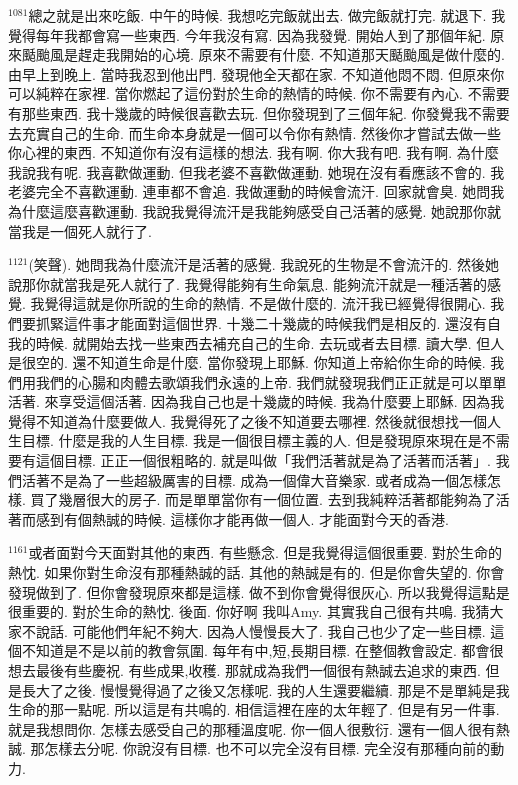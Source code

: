 \documentclass{book}
\begin{document}
$^{1081}$總之就是出來吃飯.
中午的時候.
我想吃完飯就出去.
做完飯就打完.
就退下.
我覺得每年我都會寫一些東西.
今年我沒有寫.
因為我發覺.
開始人到了那個年紀.
原來颳颱風是趕走我開始的心境.
原來不需要有什麼.
不知道那天颳颱風是做什麼的.
由早上到晚上.
當時我忍到他出門.
發現他全天都在家.
不知道他悶不悶.
但原來你可以純粹在家裡.
當你燃起了這份對於生命的熱情的時候.
你不需要有內心.
不需要有那些東西.
我十幾歲的時候很喜歡去玩.
但你發現到了三個年紀.
你發覺我不需要去充實自己的生命.
而生命本身就是一個可以令你有熱情.
然後你才嘗試去做一些你心裡的東西.
不知道你有沒有這樣的想法.
我有啊.
你大我有吧.
我有啊.
為什麼我說我有呢.
我喜歡做運動.
但我老婆不喜歡做運動.
她現在沒有看應該不會的.
我老婆完全不喜歡運動.
連車都不會追.
我做運動的時候會流汗.
回家就會臭.
她問我為什麼這麼喜歡運動.
我說我覺得流汗是我能夠感受自己活著的感覺.
她說那你就當我是一個死人就行了.

$^{1121}$(笑聲).
她問我為什麼流汗是活著的感覺.
我說死的生物是不會流汗的.
然後她說那你就當我是死人就行了.
我覺得能夠有生命氣息.
能夠流汗就是一種活著的感覺.
我覺得這就是你所說的生命的熱情.
不是做什麼的.
流汗我已經覺得很開心.
我們要抓緊這件事才能面對這個世界.
十幾二十幾歲的時候我們是相反的.
還沒有自我的時候.
就開始去找一些東西去補充自己的生命.
去玩或者去目標.
讀大學.
但人是很空的.
還不知道生命是什麼.
當你發現上耶穌.
你知道上帝給你生命的時候.
我們用我們的心腸和肉體去歌頌我們永遠的上帝.
我們就發現我們正正就是可以單單活著.
來享受這個活著.
因為我自己也是十幾歲的時候.
我為什麼要上耶穌.
因為我覺得不知道為什麼要做人.
我覺得死了之後不知道要去哪裡.
然後就很想找一個人生目標.
什麼是我的人生目標.
我是一個很目標主義的人.
但是發現原來現在是不需要有這個目標.
正正一個很粗略的.
就是叫做「我們活著就是為了活著而活著」.
我們活著不是為了一些超級厲害的目標.
成為一個偉大音樂家.
或者成為一個怎樣怎樣.
買了幾層很大的房子.
而是單單當你有一個位置.
去到我純粹活著都能夠為了活著而感到有個熱誠的時候.
這樣你才能再做一個人.
才能面對今天的香港.

$^{1161}$或者面對今天面對其他的東西.
有些懸念.
但是我覺得這個很重要.
對於生命的熱忱.
如果你對生命沒有那種熱誠的話.
其他的熱誠是有的.
但是你會失望的.
你會發現做到了.
但你會發現原來都是這樣.
做不到你會覺得很灰心.
所以我覺得這點是很重要的.
對於生命的熱忱.
後面.
你好啊 我叫Amy.
其實我自己很有共鳴.
我猜大家不說話.
可能他們年紀不夠大.
因為人慢慢長大了.
我自己也少了定一些目標.
這個不知道是不是以前的教會氛圍.
每年有中,短,長期目標.
在整個教會設定.
都會很想去最後有些慶祝.
有些成果,收穫.
那就成為我們一個很有熱誠去追求的東西.
但是長大了之後.
慢慢覺得過了之後又怎樣呢.
我的人生還要繼續.
那是不是單純是我生命的那一點呢.
所以這是有共鳴的.
相信這裡在座的太年輕了.
但是有另一件事.
就是我想問你.
怎樣去感受自己的那種溫度呢.
你一個人很敷衍.
還有一個人很有熱誠.
那怎樣去分呢.
你說沒有目標.
也不可以完全沒有目標.
完全沒有那種向前的動力.
\end{document}
